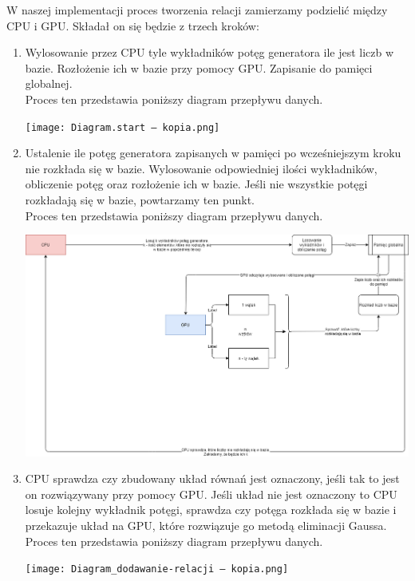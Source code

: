 \documentclass{article}
\begin{document}
W naszej implementacji proces tworzenia relacji zamierzamy podzielić między CPU i GPU. Składał on się będzie z trzech kroków:
\begin{enumerate}
    \item Wylosowanie przez CPU tyle wykładników potęg generatora ile jest liczb w bazie. Rozłożenie ich w bazie przy pomocy GPU. Zapisanie do pamięci globalnej.\\
    Proces ten przedstawia poniższy diagram przepływu danych.
    \begin{center}
    \texttt{[image: Diagram.start — kopia.png]}
    \end{center}
    \item Ustalenie ile potęg generatora zapisanych w pamięci po wcześniejszym kroku nie rozkłada się w bazie. Wylosowanie odpowiedniej ilości wykładników, obliczenie potęg oraz rozłożenie ich w bazie. Jeśli nie wszystkie potęgi rozkładają się w bazie, powtarzamy ten punkt.\\
    Proces ten przedstawia poniższy diagram przepływu danych.
    \begin{center}
    \includegraphics[width = 15 cm]{Diagram_uzupełnienie_do_n — kopia.png}
    \end{center}
    \newpage
    \item CPU sprawdza czy zbudowany układ równań jest oznaczony, jeśli tak to jest on rozwiązywany przy pomocy GPU. Jeśli układ nie jest oznaczony to CPU losuje kolejny wykładnik potęgi, sprawdza czy potęga rozkłada się w bazie i przekazuje układ na GPU, które rozwiązuje go metodą eliminacji Gaussa.\\
    Proces ten przedstawia poniższy diagram przepływu danych.
    \begin{center}
    \texttt{[image: Diagram\_dodawanie-relacji — kopia.png]}
    \end{center}
\end{enumerate}
\end{document}
